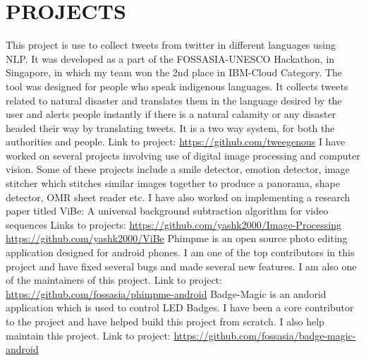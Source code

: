 \documentclass[11pt,a4paper,sans]{moderncv}        %
\begin{document}
\section{PROJECTS}
{This project is use to collect tweets from twitter in different languages using NLP. It was developed as a part of the FOSSASIA-UNESCO Hackathon, in Singapore, in which my team won the 2nd place in IBM-Cloud Category. The tool was designed for people who speak indigenous languages. It collects tweets related to natural disaster and translates them in the language desired by the user and alerts people instantly if there is a natural calamity or any disaster headed their way by translating tweets. It is a two way system, for both the authorities and people.  Link to project:{\newline}
\url{https://github.com/tweegenous}}{}
{I have worked on several projects involving use of digital image processing and computer vision. Some of these projects include a smile detector, emotion detector, image stitcher which stitches similar images together to produce a panorama, shape detector, OMR sheet reader etc. I have also worked on implementing a research paper titled ViBe: A universal background subtraction algorithm for video sequences Links to projects:{\newline} \url{https://github.com/yashk2000/Image-Processing} {\newline} \url{https://github.com/yashk2000/ViBe}}{}  %
{Phimpme is an open source photo editing application designed for android phones. I am one of the top contributors in this project and have fixed several bugs and made several new features. I am also one of the maintainers of this project. Link to project:{\newline} \url{https://github.com/fossasia/phimpme-android}}{}  %
{Badge-Magic is an andorid application which is used to control LED Badges. I have been a core contributor to the project and have helped build this project from scratch. I also help maintain this project. Link to project:{\newline} \url{https://github.com/fossasia/badge-magic-android}}{}  %
\end{document}
